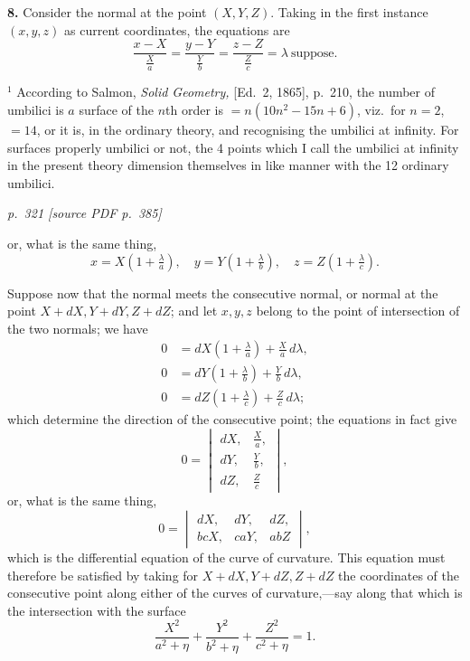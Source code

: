 \documentclass[11pt,a4paper]{article}
\newcommand{\pagemarker}[2]{\par\bigskip\noindent\textit{p.~#1 [source PDF p.~#2]}\par\smallskip}
\begin{document}
\textbf{8.} Consider the normal at the point $(X, Y, Z)$. Taking in the first instance $(x, y, z)$ as current coordinates, the equations are
\[
\frac{x - X}{\tfrac{X}{a}} = \frac{y - Y}{\tfrac{Y}{b}} = \frac{z - Z}{\tfrac{Z}{c}} = \lambda \ \text{suppose}.
\]

\smallskip
\footnotesize
$^1$ According to Salmon, \textit{Solid Geometry,} [Ed.\ 2, 1865], p.~210, the number of umbilici is $a$ surface of the $n$th order is $= n(10n^2 - 15n + 6)$, viz.\ for $n = 2$, $= 14$, or it is, in the ordinary theory, and recognising the umbilici at infinity. For surfaces properly umbilici or not, the 4 points which I call the umbilici at infinity in the present theory dimension themselves in like manner with the 12 ordinary umbilici.

\clearpage

\pagemarker{321}{385}

or, what is the same thing,
\[
x = X\left(1 + \tfrac{\lambda}{a}\right),\quad y = Y\left(1 + \tfrac{\lambda}{b}\right),\quad z = Z\left(1 + \tfrac{\lambda}{c}\right).
\]

Suppose now that the normal meets the consecutive normal, or normal at the point $X + dX, Y + dY, Z + dZ$; and let $x, y, z$ belong to the point of intersection of the two normals; we have
\begin{align*}
0 &= dX\left(1 + \tfrac{\lambda}{a}\right) + \tfrac{X}{a}\,d\lambda,\\
0 &= dY\left(1 + \tfrac{\lambda}{b}\right) + \tfrac{Y}{b}\,d\lambda,\\
0 &= dZ\left(1 + \tfrac{\lambda}{c}\right) + \tfrac{Z}{c}\,d\lambda;
\end{align*}
which determine the direction of the consecutive point; the equations in fact give
\[
0 = \begin{vmatrix} dX, & \tfrac{X}{a},\\ dY, & \tfrac{Y}{b},\\ dZ, & \tfrac{Z}{c} \end{vmatrix},
\]
or, what is the same thing,
\[
0 = \begin{vmatrix} dX, & dY, & dZ,\\ b cX, & caY, & abZ \end{vmatrix},
\]
which is the differential equation of the curve of curvature. This equation must therefore be satisfied by taking for $X + dX, Y + dZ, Z + dZ$ the coordinates of the consecutive point along either of the curves of curvature,---say along that which is the intersection with the surface
\[
\frac{X^2}{a^2 + \eta} + \frac{Y^2}{b^2 + \eta} + \frac{Z^2}{c^2 + \eta} = 1.
\]
\end{document}

